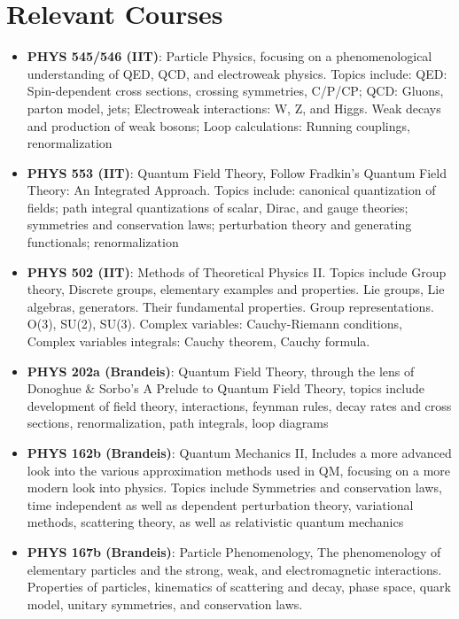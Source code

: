 \documentclass[a4paper,20pt]{article}
\newcommand{\resumeItem}[2]{
  \item\small{
    \textbf{#1}{: #2 \vspace{-2pt}}
  }
}
\newcommand{\resumeSubItem}[2]{\resumeItem{#1}{#2}\vspace{-3pt}}
\newcommand{\resumeSubHeadingListStart}{\begin{itemize}[leftmargin=*]}
\newcommand{\resumeSubHeadingListEnd}{\end{itemize}}
\begin{document}
\section{Relevant Courses}
\resumeSubHeadingListStart
\resumeSubItem{PHYS 545/546 (IIT)}{Particle Physics, focusing on a phenomenological understanding of QED, QCD, and electroweak physics. Topics include: QED: Spin-dependent cross sections, crossing symmetries, C/P/CP; QCD: Gluons, parton model, jets; Electroweak interactions: W, Z, and Higgs. Weak decays and production of weak bosons; Loop calculations: Running couplings, renormalization}
\vspace{2pt}
\resumeSubItem{PHYS 553 (IIT)}{Quantum Field Theory, Follow Fradkin's Quantum Field Theory: An Integrated Approach. Topics include: canonical quantization of fields; path integral quantizations of scalar, Dirac, and gauge theories; symmetries and conservation laws; perturbation theory and generating functionals; renormalization}
\vspace{2pt}
\resumeSubItem{PHYS 502 (IIT)}{Methods of Theoretical Physics II. Topics include Group theory, Discrete groups, elementary examples and properties. Lie groups, Lie algebras, generators. Their fundamental properties. Group representations. O(3), SU(2), SU(3). Complex variables: Cauchy-Riemann conditions, Complex variables integrals: Cauchy theorem, Cauchy formula.}
\vspace{2pt}
\resumeSubItem{PHYS 202a (Brandeis)}{Quantum Field Theory, through the lens of Donoghue \& Sorbo's A Prelude to Quantum Field Theory, topics include development of field theory, interactions, feynman rules, decay rates and cross sections, renormalization, path integrals, loop diagrams}
\vspace{2pt}
\resumeSubItem{PHYS 162b (Brandeis)}{Quantum Mechanics II, Includes a more advanced look into the various approximation methods used in QM, focusing on a more modern look into physics. Topics include Symmetries and conservation laws, time independent as well as dependent perturbation theory, variational methods, scattering theory, as well as relativistic quantum mechanics}
\vspace{2pt}
\resumeSubItem{PHYS 167b (Brandeis)}{Particle Phenomenology, The phenomenology of elementary particles and the strong, weak, and electromagnetic interactions. Properties of particles, kinematics of scattering and decay, phase space, quark model, unitary symmetries, and conservation laws.}
\resumeSubHeadingListEnd
\vspace{-5pt}
\vspace{-5pt}
\end{document}
